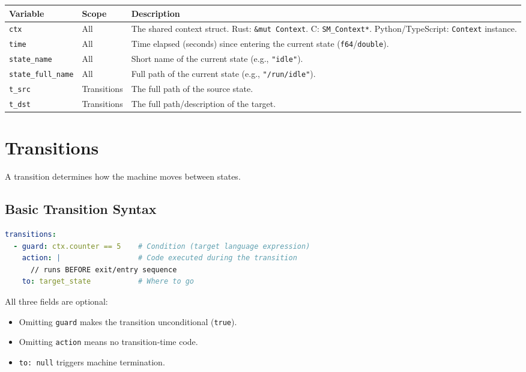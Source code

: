 \documentclass[a4paper,11pt]{article}
\begin{document}
\begin{longtable}{@{}llp{7cm}@{}}
\toprule
\textbf{Variable} & \textbf{Scope} & \textbf{Description} \\
\midrule
\endhead
\texttt{ctx} & All & The shared context struct. Rust: \texttt{\&mut Context}. C: \texttt{SM\_Context*}. Python/TypeScript: \texttt{Context} instance. \\
\texttt{time} & All & Time elapsed (seconds) since entering the current state (\texttt{f64}/\texttt{double}). \\
\texttt{state\_name} & All & Short name of the current state (e.g., \texttt{"idle"}). \\
\texttt{state\_full\_name} & All & Full path of the current state (e.g., \texttt{"/run/idle"}). \\
\texttt{t\_src} & Transitions & The full path of the source state. \\
\texttt{t\_dst} & Transitions & The full path/description of the target. \\
\bottomrule
\end{longtable}

\section{Transitions}
\label{sec:transitions}
A transition determines how the machine moves between states.

\subsection{Basic Transition Syntax}

\begin{lstlisting}[language=YAML, caption={Transition syntax}]
transitions:
  - guard: ctx.counter == 5    # Condition (target language expression)
    action: |                  # Code executed during the transition
      // runs BEFORE exit/entry sequence
    to: target_state           # Where to go
\end{lstlisting}

All three fields are optional:
\begin{itemize}
    \item Omitting \texttt{guard} makes the transition unconditional (\texttt{true}).
    \item Omitting \texttt{action} means no transition-time code.
    \item \texttt{to: null} triggers machine termination.
\end{itemize}
\end{document}
